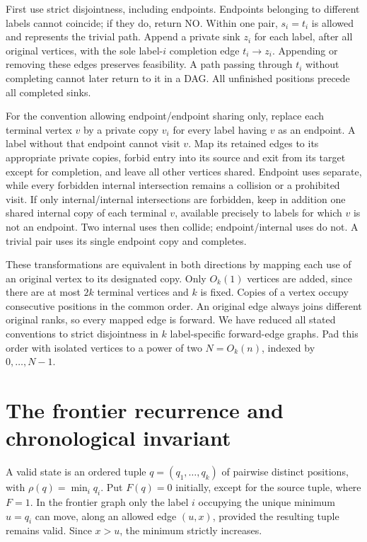 \documentclass[acmlarge,11pt,screen,nonacm]{acmart}
\newcommand{\rh}{\rho}
\begin{document}
First use strict disjointness, including endpoints. Endpoints belonging to
different labels cannot coincide; if they do, return NO. Within one pair,
$s_i=t_i$ is allowed and represents the trivial path. Append a private sink
$z_i$ for each label, after all original vertices, with the sole label-$i$
completion edge $t_i\to z_i$. Appending or removing these edges preserves
feasibility. A path passing through $t_i$ without completing cannot later
return to it in a DAG. All unfinished positions precede all completed sinks.

For the convention allowing endpoint/endpoint sharing only, replace each
terminal vertex $v$ by a private copy $v_i$ for every label having $v$ as an
endpoint. A label without that endpoint cannot visit $v$. Map its retained
edges to its appropriate private copies, forbid entry into its source and
exit from its target except for completion, and leave all other vertices
shared. Endpoint uses separate, while every forbidden internal intersection
remains a collision or a prohibited visit. If only internal/internal
intersections are forbidden, keep in addition one shared internal copy of
each terminal $v$, available precisely to labels for which $v$ is not an
endpoint. Two internal uses then collide; endpoint/internal uses do not.
A trivial pair uses its single endpoint copy and completes.

These transformations are equivalent in both directions by mapping each use
of an original vertex to its designated copy. Only $O_k(1)$ vertices are
added, since there are at most $2k$ terminal vertices and $k$ is fixed.
Copies of a vertex occupy consecutive positions in the common order. An
original edge always joins different original ranks, so every mapped edge
is forward. We have reduced all stated conventions to strict disjointness
in $k$ label-specific forward-edge graphs. Pad this order with isolated
vertices to a power of two $N=O_k(n)$, indexed by $0,\ldots,N-1$.

\section{The frontier recurrence and chronological invariant}\label{sec:frontier}
A valid state is an ordered tuple $q=(q_1,\ldots,q_k)$ of pairwise distinct
positions, with $\rh(q)=\min_i q_i$. Put $F(q)=0$ initially, except for the
source tuple, where $F=1$. In the frontier graph only the label $i$ occupying
the unique minimum $u=q_i$ can move, along an allowed edge $(u,x)$, provided
the resulting tuple remains valid. Since $x>u$, the minimum strictly increases.
\end{document}
